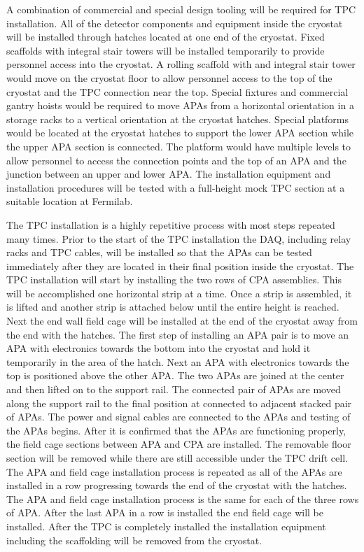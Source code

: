 A combination of commercial and special design tooling will be required for TPC installation. All of the 
detector components and equipment inside the cryostat will be installed through hatches located at one 
end of the cryostat.  Fixed scaffolds with integral stair towers will be installed temporarily to provide 
personnel access into the cryostat. A rolling scaffold with and integral stair tower would move on the 
cryostat floor to allow personnel access to the top of the cryostat and the TPC connection near the top. 
Special fixtures and commercial gantry hoists would be required to move APAs  from a horizontal 
orientation in a storage racks to a vertical orientation at the cryostat hatches. Special platforms would be 
located at the cryostat hatches to support the lower APA section while the upper APA section is 
connected. The platform would have multiple levels to allow personnel to access the connection points 
and the top of an APA and the junction between an upper and lower APA. The installation equipment and 
installation procedures will be tested with a full-height mock TPC section at a suitable location at 
Fermilab. 

The TPC installation is a highly repetitive process with most steps repeated many times. Prior to the start 
of the TPC installation the DAQ, including relay racks and TPC cables, will be installed so that the APAs 
can be tested immediately after they are located in their final position inside the cryostat. The TPC 
installation will start by installing the two rows of CPA assemblies. This will be accomplished one 
horizontal strip at a time. Once a strip is assembled, it is lifted and another strip is attached below until 
the entire height is reached. Next the end wall field cage will be installed at the end of the cryostat away 
from the end with the hatches. The first step of installing an APA pair is to move an APA with electronics 
towards the bottom into the cryostat and hold it temporarily in the area of the hatch. Next an APA with 
electronics towards the top is positioned above the other APA. The two APAs are joined at the center and 
then lifted on to the support rail. The connected pair of APAs are moved along the support rail to the 
final position at connected to adjacent stacked pair of APAs.  The power and signal cables are connected 
to the APAs and testing of the APAs begins. After it is confirmed that the APAs are functioning properly, 
the field cage sections between APA and CPA are installed. The removable floor section will be removed 
while there are still accessible under the TPC drift cell.  The APA and field cage installation process is 
repeated as all of the APAs are installed in a row progressing towards the end of the cryostat with the 
hatches. The APA and field cage installation process is the same for each of the three rows of APA. After 
the last APA in a row is installed the end field cage will be installed. After the TPC is completely installed 
the installation equipment including the scaffolding will be removed from the cryostat.

